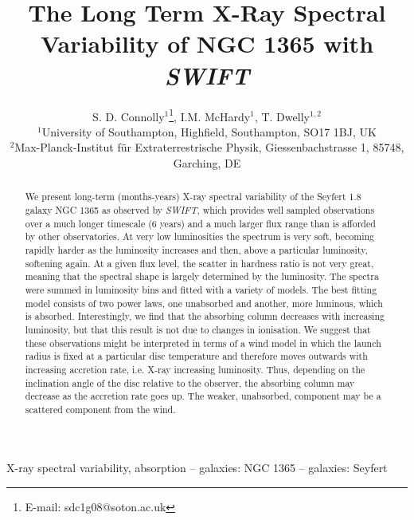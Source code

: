 \documentclass[useAMS,usenatbib]{sam}
\title[The Long Term X-Ray Spectral Variability of NGC 1365 with {\it SWIFT}]{The Long Term X-Ray Spectral Variability of NGC 1365 with {\it SWIFT}}
\author[S. D. Connolly, I.M. McHardy and T. Dwelly]{S. D. Connolly$^{1}$\thanks{E-mail: sdc1g08@soton.ac.uk}, I.M. McHardy$^{1}$, T. Dwelly$^{1,2}$ \\
$^{1}$University of Southampton, Highfield, Southampton, SO17 1BJ, UK\\
$^{2}$Max-Planck-Institut f\"{u}r Extraterrestrische Physik, Giessenbachstrasse 1, 85748, Garching, DE}
\begin{document}
\pagerange{\pageref{firstpage}--\pageref{lastpage}} 

\maketitle

\label{firstpage}


\begin{abstract}

We present long-term (months-years) X-ray spectral variability of the
Seyfert 1.8 galaxy NGC 1365 as observed by {\it SWIFT}, which provides
well sampled observations over a much longer timescale (6 years) and a
much larger flux range than is afforded by other observatories. At
very low luminosities the spectrum is very soft, becoming rapidly
harder as the luminosity increases and then, above a particular
luminosity, softening again.  At a given flux level, the scatter
in hardness ratio is not very great, meaning that the spectral shape is
largely determined by the luminosity.  The spectra were summed in
luminosity bins and fitted with a variety of models. The best fitting model
consists of two power laws, one unabsorbed and another, more luminous,
which is absorbed. Interestingly, we find that the absorbing column
decreases with increasing luminosity, but that this result is not due
to changes in ionisation. We suggest that these observations might be
interpreted in terms of a wind model in which the launch radius is
fixed at a particular disc temperature and therefore moves outwards with
increasing accretion rate, i.e. X-ray increasing luminosity. Thus, depending
on the inclination angle of the disc relative to the observer, the absorbing column may decrease
as the accretion rate goes up. The weaker, unabsorbed, component may
be a scattered component from the wind. 

\end{abstract}

\begin{keywords}
X-ray spectral variability, absorption – galaxies: NGC 1365 – galaxies: Seyfert
\end{keywords}

\end{document}
